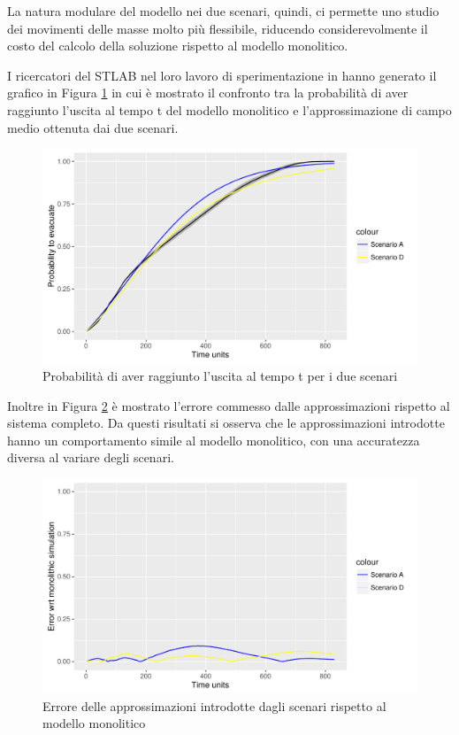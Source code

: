 La natura modulare del modello nei due scenari, quindi, ci permette uno studio dei movimenti delle masse molto più flessibile, riducendo considerevolmente il costo del calcolo della soluzione rispetto al modello monolitico.

I ricercatori del STLAB nel loro lavoro di sperimentazione in \cite{esperimenti-sandro} hanno generato il grafico in Figura \ref{fig:scenariosAD} in cui è mostrato il confronto tra la probabilità di aver raggiunto l'uscita al tempo t del modello monolitico e l'approssimazione di campo medio ottenuta dai due scenari.

\begin{figure}[htbp]
\centering
\includegraphics[width=.8\textwidth,height=\textheight,keepaspectratio]{images/scenariosAD.pdf}
\caption{Probabilità di aver raggiunto l'uscita al tempo t per i due scenari}
\label{fig:scenariosAD}
\end{figure}

Inoltre in Figura \ref{fig:errorsplotAD} è mostrato l'errore commesso dalle approssimazioni rispetto al sistema completo. Da questi risultati si osserva che le approssimazioni introdotte hanno un comportamento simile al modello monolitico, con una accuratezza diversa al variare degli scenari.

\begin{figure}[htbp]
\centering
\includegraphics[width=.8\textwidth,height=\textheight,keepaspectratio]{images/errorplotAD.pdf}
\caption{Errore delle approssimazioni introdotte dagli scenari rispetto al modello monolitico}
\label{fig:errorsplotAD}
\end{figure}



 